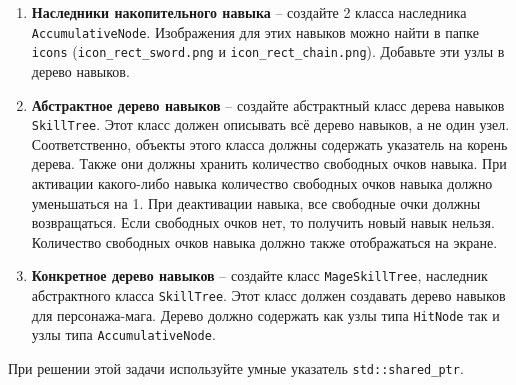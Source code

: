 \documentclass{article}
\begin{document}
\begin{enumerate}
\item \textbf{Наследники накопительного навыка} -- создайте 2 класса наследника \texttt{AccumulativeNode}. Изображения для этих навыков можно найти в папке \texttt{icons} (\texttt{icon\_rect\_sword.png} и \texttt{icon\_rect\_chain.png}). Добавьте эти узлы в дерево навыков.


\item \textbf{Абстрактное дерево навыков} -- создайте абстрактный класс дерева навыков \texttt{SkillTree}. Этот класс должен описывать всё дерево навыков, а не один узел. Соответственно, объекты этого класса должны содержать указатель на корень дерева. Также они должны хранить количество свободных очков навыка. При активации какого-либо навыка количество свободных очков навыка должно уменьшаться на 1. При деактивации навыка, все свободные очки должны возвращаться. Если свободных очков нет, то получить новый навык нельзя. Количество свободных очков навыка должно также отображаться на экране.

\item \textbf{Конкретное дерево навыков} -- создайте класс \texttt{MageSkillTree}, наследник абстрактного класса \texttt{SkillTree}. Этот класс должен создавать дерево навыков для персонажа-мага. Дерево должно содержать как узлы типа \texttt{HitNode} так и узлы типа \texttt{AccumulativeNode}.
\end{enumerate}

При решении этой задачи используйте умные указатель \texttt{std::shared\_ptr}.
\end{document}
